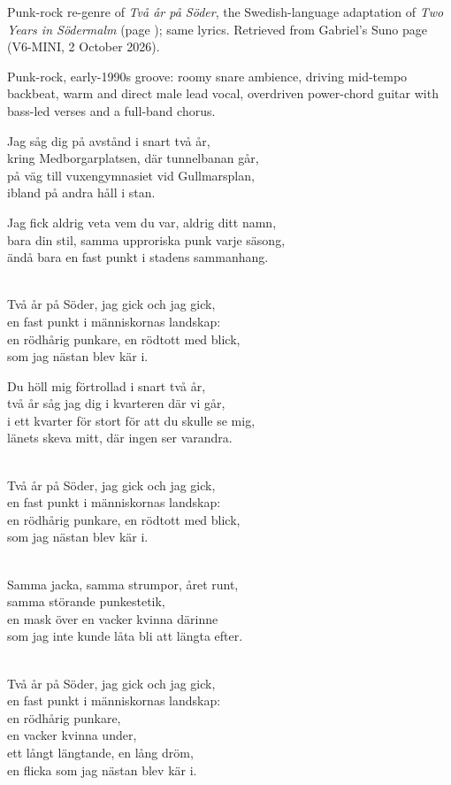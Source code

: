 
\begin{notes}
Punk-rock re-genre of \emph{Två år på Söder}, the Swedish-language adaptation of \emph{Two Years in Södermalm} (page \pageref{sec:two-years-in-sodermalm}); same lyrics. Retrieved from Gabriel's Suno page (V6-MINI, 2 October 2026).
\end{notes}
\begin{style}
Punk-rock, early-1990s groove: roomy snare ambience, driving mid-tempo backbeat, warm and direct male lead vocal, overdriven power-chord guitar with bass-led verses and a full-band chorus.
\end{style}
\begin{lyrics}
Jag såg dig på avstånd i snart två år,\\
kring Medborgarplatsen, där tunnelbanan går,\\
på väg till vuxengymnasiet vid Gullmarsplan,\\
ibland på andra håll i stan.

Jag fick aldrig veta vem du var, aldrig ditt namn,\\
bara din stil, samma upproriska punk varje säsong,\\
ändå bara en fast punkt i stadens sammanhang.

\\
Två år på Söder, jag gick och jag gick,\\
en fast punkt i människornas landskap:\\
en rödhårig punkare, en rödtott med blick,\\
som jag nästan blev kär i.

Du höll mig förtrollad i snart två år,\\
två år såg jag dig i kvarteren där vi går,\\
i ett kvarter för stort för att du skulle se mig,\\
länets skeva mitt, där ingen ser varandra.

\\
Två år på Söder, jag gick och jag gick,\\
en fast punkt i människornas landskap:\\
en rödhårig punkare, en rödtott med blick,\\
som jag nästan blev kär i.

\\
Samma jacka, samma strumpor, året runt,\\
samma störande punkestetik,\\
en mask över en vacker kvinna därinne\\
som jag inte kunde låta bli att längta efter.

\\
Två år på Söder, jag gick och jag gick,\\
en fast punkt i människornas landskap:\\
en rödhårig punkare,\\
en vacker kvinna under,\\
ett långt längtande, en lång dröm,\\
en flicka som jag nästan blev kär i.
\end{lyrics}

